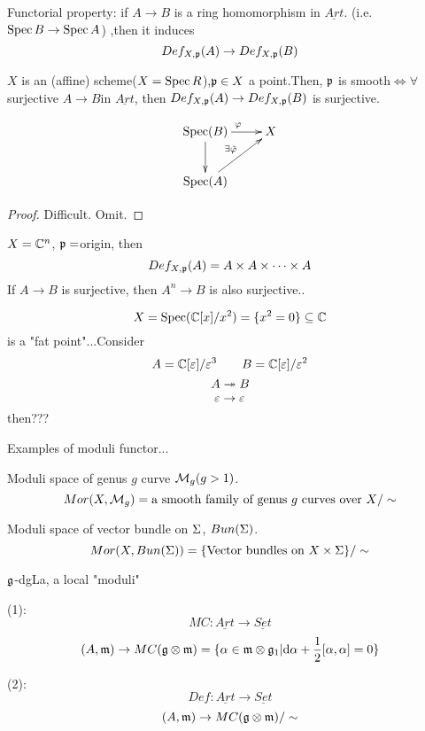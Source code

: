 Functorial property: if $A\to B$ is a ring homomorphism in $\underline{Art}$.
(i.e. $\operatorname{Spec} B\to\operatorname{Spec} A$) ,then it induces
$$Def_{X,\mathfrak{p}}(A)\to Def_{X,\mathfrak{p}}(B)$$

\begin{thm}

$X$ is an (affine) scheme($X=\operatorname{Spec} R$),$\mathfrak{p}\in X$ a point.Then,
$\mathfrak{p}$ is smooth$\iff\forall$ surjective $A\to B$in $\underline{Art}$,
then $Def_{X,\mathfrak{p}}(A)\to Def_{X,\mathfrak{p}}(B)$ is surjective.
\end{thm}

$$
  \xymatrix{
    \Spec(B) \ar[r]^\fai  \ar[d]
   &X
  \\
    \Spec(A) \ar[ru]^{\exists\tilde{\fai}}
  }
$$

\begin{proof}
Difficult. Omit.
\end{proof}

\begin{example}
$X=\mathbb{C}^n$, $\mathfrak{p}=$origin, then
$$Def_{X,\mathfrak{p}}(A)=A\times A\times\cdots\times A$$
If $A\to B$ is surjective, then $A^n\to B$ is also surjective..
\end{example}

\begin{example}
$$X=\operatorname{Spec}(\mathbb{C}[x]/x^2)=\{x^2=0\}\subseteq\mathbb{C}$$
is a "fat point"...Consider
$$A=\mathbb{C}[\varepsilon]/\varepsilon^3\qquad B=\mathbb{C}[\varepsilon]/\varepsilon^2$$
$$A\twoheadrightarrow B$$
$$\varepsilon\to\varepsilon$$
then???
\end{example}

Examples of moduli functor...

\begin{example}
Moduli space of genus $g$ curve $\mathcal{M}_g(g>1)$.
$$Mor(X,\mathcal{M}_g)=\text{a smooth family of genus $g$ curves over $X$}/\sim$$
\end{example}

\begin{example}Moduli space of vector bundle on $\Sigma$, $Bun(\Sigma)$.
$$Mor(X,Bun(\Sigma))=\{\text{Vector bundles on $X\times\Sigma$}\}/\sim$$
\end{example}

$\mathfrak{g}$-dgLa, a local "moduli"

(1):
$$MC:\underline{Art}\to\underline{Set}$$
$$(A,\mathfrak{m})\to MC(\mathfrak{g}\otimes \mathfrak{m})
=\{\alpha\in\mathfrak{m}\otimes\mathfrak{g}_1|\mathrm{d}\alpha+\frac{1}{2}[\alpha,\alpha]=0\}$$

(2):
$$Def:\underline{Art}\to\underline{Set}$$
$$(A,\mathfrak{m})\to MC(\mathfrak{g}\otimes \mathfrak{m})/\sim$$

